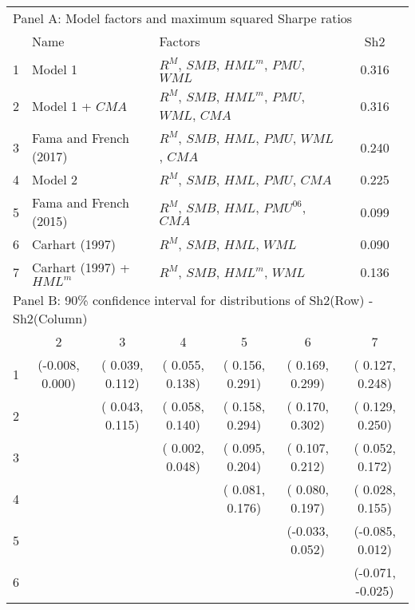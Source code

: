 
\begin{tabular}{lcccccc}
  \toprule
  \multicolumn{7}{l}{Panel A: Model factors and maximum squared Sharpe ratios} \\
        & \multicolumn{2}{l}{Name}                         & \multicolumn{3}{l}{Factors}                                   & Sh2   \\
  1     & \multicolumn{2}{l}{Model 1}                      & \multicolumn{3}{l}{$R^M$, $SMB$, $HML^m$, $PMU$, $WML$}        & 0.316 \\
  2     & \multicolumn{2}{l}{Model 1 + $CMA$}              & \multicolumn{3}{l}{$R^M$, $SMB$, $HML^m$, $PMU$, $WML$, $CMA$} & 0.316 \\
  3     & \multicolumn{2}{l}{Fama and French (2017)}       & \multicolumn{3}{l}{$R^M$, $SMB$, $HML$, $PMU$, $WML$, $CMA$}   & 0.240 \\
  4     & \multicolumn{2}{l}{Model 2}                      & \multicolumn{3}{l}{$R^M$, $SMB$, $HML$, $PMU$, $CMA$}          & 0.225 \\
  5     & \multicolumn{2}{l}{Fama and French (2015)}       & \multicolumn{3}{l}{$R^M$, $SMB$, $HML$, $PMU^{06}$, $CMA$}     & 0.099 \\
  6     & \multicolumn{2}{l}{Carhart (1997)}               & \multicolumn{3}{l}{$R^M$, $SMB$, $HML$, $WML$}                 & 0.090 \\
  7     & \multicolumn{2}{l}{Carhart (1997) + $HML^m$}     & \multicolumn{3}{l}{$R^M$, $SMB$, $HML^m$, $WML$}               & 0.136 \\
  \midrule
  \multicolumn{7}{l}{Panel B: 90\% confidence interval for distributions of Sh2(Row) - Sh2(Column)} \\
        &        2         &        3         &        4         &        5         &        6         &        7         \\
  1     & (-0.008,  0.000) & ( 0.039,  0.112) & ( 0.055,  0.138) & ( 0.156,  0.291) & ( 0.169,  0.299) & ( 0.127,  0.248) \\
  2     &                  & ( 0.043,  0.115) & ( 0.058,  0.140) & ( 0.158,  0.294) & ( 0.170,  0.302) & ( 0.129,  0.250) \\
  3     &                  &                  & ( 0.002,  0.048) & ( 0.095,  0.204) & ( 0.107,  0.212) & ( 0.052,  0.172) \\
  4     &                  &                  &                  & ( 0.081,  0.176) & ( 0.080,  0.197) & ( 0.028,  0.155) \\
  5     &                  &                  &                  &                  & (-0.033,  0.052) & (-0.085,  0.012) \\
  6     &                  &                  &                  &                  &                  & (-0.071, -0.025) \\
  \bottomrule
\end{tabular}

